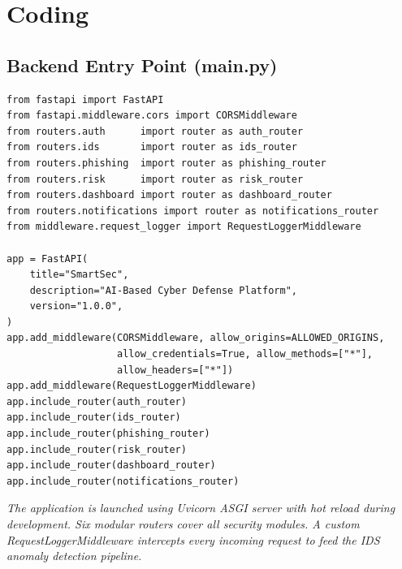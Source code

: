 \chapter{Coding}

\section{Backend Entry Point (main.py)}
\begin{verbatim}
from fastapi import FastAPI
from fastapi.middleware.cors import CORSMiddleware
from routers.auth      import router as auth_router
from routers.ids       import router as ids_router
from routers.phishing  import router as phishing_router
from routers.risk      import router as risk_router
from routers.dashboard import router as dashboard_router
from routers.notifications import router as notifications_router
from middleware.request_logger import RequestLoggerMiddleware

app = FastAPI(
    title="SmartSec",
    description="AI-Based Cyber Defense Platform",
    version="1.0.0",
)
app.add_middleware(CORSMiddleware, allow_origins=ALLOWED_ORIGINS,
                   allow_credentials=True, allow_methods=["*"],
                   allow_headers=["*"])
app.add_middleware(RequestLoggerMiddleware)
app.include_router(auth_router)
app.include_router(ids_router)
app.include_router(phishing_router)
app.include_router(risk_router)
app.include_router(dashboard_router)
app.include_router(notifications_router)
\end{verbatim}
\textit{The application is launched using Uvicorn ASGI server with hot reload during development. Six modular routers cover all security modules. A custom RequestLoggerMiddleware intercepts every incoming request to feed the IDS anomaly detection pipeline.}

